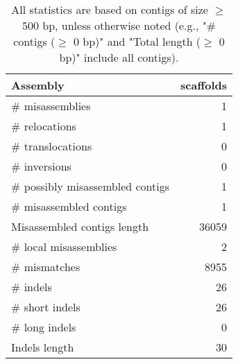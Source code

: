 \documentclass[12pt,a4paper]{article}
\begin{document}
\begin{table}[ht]
\begin{center}
\caption{All statistics are based on contigs of size $\geq$ 500 bp, unless otherwise noted (e.g., "\# contigs ($\geq$ 0 bp)" and "Total length ($\geq$ 0 bp)" include all contigs).}
\begin{tabular}{|l*{1}{|r}|}
\hline
Assembly & scaffolds \\ \hline
\# misassemblies & 1 \\ \hline
\hspace{5mm}\# relocations & 1 \\ \hline
\hspace{5mm}\# translocations & 0 \\ \hline
\hspace{5mm}\# inversions & 0 \\ \hline
\# possibly misassembled contigs & 1 \\ \hline
\# misassembled contigs & 1 \\ \hline
Misassembled contigs length & 36059 \\ \hline
\# local misassemblies & 2 \\ \hline
\# mismatches & 8955 \\ \hline
\# indels & 26 \\ \hline
\hspace{5mm}\# short indels & 26 \\ \hline
\hspace{5mm}\# long indels & 0 \\ \hline
Indels length & 30 \\ \hline
\end{tabular}
\end{center}
\end{table}
\end{document}
